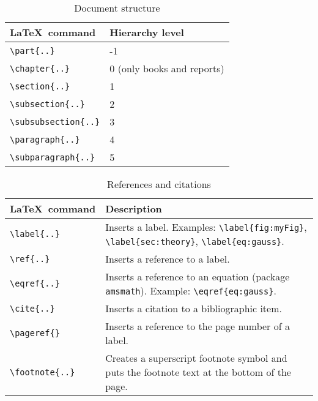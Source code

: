\documentclass{article}
\begin{document}
\begin{table}[htbp]
\caption{Document structure}
\begin{tabularx}{\textwidth}{ll}
\toprule
\LaTeX~command & Hierarchy level \\
\midrule
\verb|\part|\verb|{..}| & -1\\
\verb|\chapter|\verb|{..}| & 0 (only books and reports)\\
\verb|\section|\verb|{..}| & 1\\
\verb|\subsection|\verb|{..}| & 2\\
\verb|\subsubsection|\verb|{..}| & 3\\
\verb|\paragraph|\verb|{..}| & 4\\
\verb|\subparagraph|\verb|{..}| & 5\\
\bottomrule
\end{tabularx}
\end{table}

\begin{table}[htbp]
\caption{References and citations}
\begin{tabularx}{\textwidth}{lX}
\toprule
\LaTeX~command & Description\\
\midrule
\verb|\label|\verb|{..}| & Inserts a label. Examples: \verb|\label|\verb|{fig:myFig}|, \verb|\label|\verb|{sec:theory}|, \verb|\label{eq:gauss}|.\\
\verb|\ref|\verb|{..}| & Inserts a reference to a label.\\
\verb|\eqref|\verb|{..}| & Inserts a reference to an equation (package \verb|amsmath|). Example: \verb|\eqref|\verb|{eq:gauss}|. \\
\verb|\cite|\verb|{..}| & Inserts a citation to a bibliographic item.\\
\verb|\pageref|\verb|{}| & Inserts a reference to the page number of a label.\\
\verb|\footnote|\verb|{..}| & Creates a superscript footnote symbol and puts the footnote text at the bottom of the page.\\
\bottomrule
\end{tabularx}
\end{table}
\end{document}
